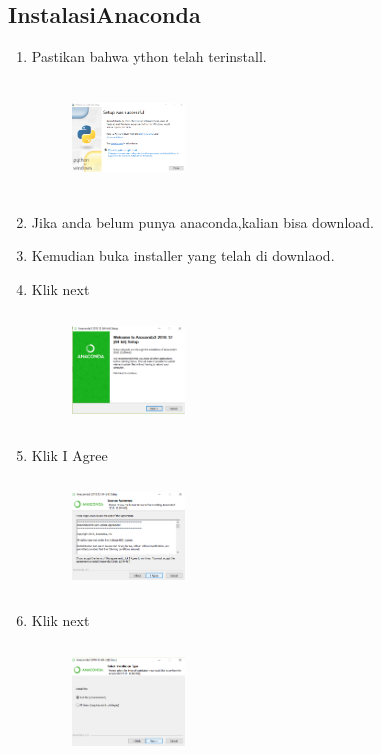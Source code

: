 \subsection{InstalasiAnaconda}
\begin{enumerate}
	\item Pastikan bahwa ython telah terinstall.
	\begin{figure}[H]
		\centering
		\includegraphics[width=3cm,height=3cm]{figures/dezha/Screenshot1.png}
		\label{awal}
		\end{figure}
	\item Jika anda belum punya anaconda,kalian bisa download.
	\item Kemudian buka installer yang telah di downlaod.
	\item Klik next
	\begin{figure}[H]
		\centering
		\includegraphics[width=3cm,height=3cm]{figures/dezha/Screenshot2.png}
		\label{Awal}
		\end{figure}

	\item Klik I Agree
	\begin{figure}[H]
		\centering
		\includegraphics[width=3cm,height=3cm]{figures/dezha/Screenshot3.png}
		\label{Klik I Agree}
		\end{figure}

	\item Klik next
	\begin{figure}[H]
		\centering
		\includegraphics[width=3cm,height=3cm]{figures/dezha/Screenshot4.png}
		\label{Pilih Just me, dan next}
		\end{figure}


\end{enumerate}
